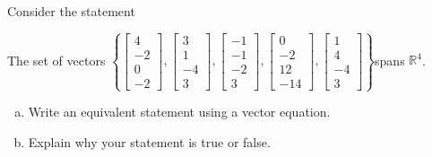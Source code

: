 
\begin{exerciseStatement}


Consider the statement 
\begin{center}\begin{minipage}{0.8\textwidth}
 The set of vectors \( \left\{ \left[\begin{array}{c}
4 \\
-2 \\
0 \\
-2
\end{array}\right] , \left[\begin{array}{c}
3 \\
1 \\
-4 \\
3
\end{array}\right] , \left[\begin{array}{c}
-1 \\
-1 \\
-2 \\
3
\end{array}\right] , \left[\begin{array}{c}
0 \\
-2 \\
12 \\
-14
\end{array}\right] , \left[\begin{array}{c}
1 \\
4 \\
-4 \\
3
\end{array}\right] \right\} \)spans \(\mathbb{R}^4\). 
\end{minipage}\end{center}
    


\begin{enumerate}[(a)]
\item  Write an equivalent statement using a vector equation.
\item  Explain why your statement is true or false.
\end{enumerate}
    
\end{exerciseStatement}
    
